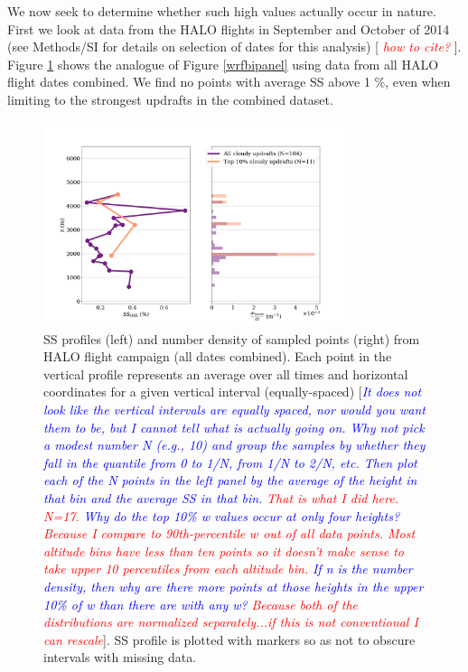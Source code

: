 \documentclass{article}
\newcommand{\drcomm}[1]{\textcolor{blue}{\textit{#1}}}
\newcommand{\klcomm}[1]{\textcolor{red}{\textit{#1}}}
\begin{document}
\clearpage
\newpage

We now seek to determine whether such high values actually occur in nature. First we look at data from the HALO flights in September and October of 2014 (see Methods/SI for details on selection of dates for this analysis) [ \klcomm{how to cite?} ]. Figure \ref{halobipanel} shows the analogue of Figure \ref{wrfbipanel} using data from all HALO flight dates combined. We find no points with average SS above 1 \%, even when limiting to the strongest updrafts in the combined dataset.

\begin{figure}[ht]
    \centering
    \includegraphics[width=9cm]{revhalo/v4_FINAL_combined_bipanel_ss_qss_vs_z_figure.png}
    \caption{SS profiles (left) and number density of sampled points (right) from HALO flight campaign (all dates combined). Each point in the vertical profile represents an average over all times and horizontal coordinates for a given vertical interval (equally-spaced) [\drcomm{It does not look like the vertical intervals are equally spaced, nor would you want them to be, but I cannot tell what is actually going on.  Why not pick a modest number N (e.g., 10) and group the samples by whether they fall in the quantile from 0 to 1/N, from 1/N to 2/N, etc.  Then plot each of the N points in the left panel by the average of the height in that bin and the average SS in that bin.} \klcomm{That is what I did here. N=17.} \drcomm{Why do the top 10\% w values occur at only four heights?} \klcomm{Because I compare to 90th-percentile $w$ out of all data points. Most altitude bins have less than ten points so it doesn't make sense to take upper 10 percentiles from each altitude bin.} \drcomm{If n is the number density, then why are there more points at those heights in the upper 10\% of w than there are with any w?} \klcomm{Because both of the distributions are normalized separately...if this is not conventional I can rescale}]. SS profile is plotted with markers so as not to obscure intervals with missing data.}
    \label{halobipanel}
\end{figure}
\end{document}
